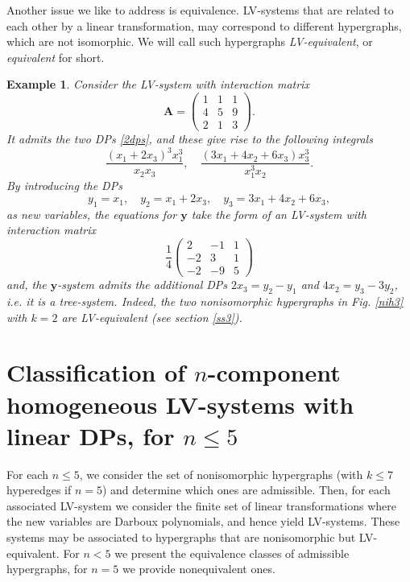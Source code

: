 \documentclass{article}
\newcounter{NN}
\newtheorem{example}[NN]{Example}
\def\A{\mathbf{A}}
\def\y{{\mathbf y}}
\begin{document}
Another issue we like to address is equivalence. LV-systems that are related to each other by a linear transformation, may correspond to different hypergraphs, which are not isomorphic. We will call such hypergraphs {\em LV-equivalent}, or {\em equivalent} for short.
\begin{example}
Consider the LV-system with interaction matrix
\[
\A=\begin{pmatrix}
1 & 1 & 1 
\\
 4 & 5 & 9 
\\
 2 & 1 & 3 
\end{pmatrix}.
\]
It admits the two DPs \eqref{2dps}, and these give rise to the following integrals
\[
\frac{\left(x_{1}+2 x_{3}\right)^3 x_{1}^{3}}{x_{2} x_{3}},\quad
\frac{\left(3 x_{1}+4 x_{2}+6 x_{3}\right) x_{3}^{3}}{x_{1}^{3} x_{2}}.
\]
By introducing the DPs
\[
y_{1} = x_{1},\quad
y_{2} = x_{1}+2 x_{3},\quad
y_{3} = 3 x_{1}+4 x_{2}+6 x_{3},
\]
as new variables, the equations for $\y$ take the form of an LV-system with interaction matrix
\[
\frac 14 \begin{pmatrix}
2 & -1 & 1 
\\
 -2 & 3 & 1 
\\
 -2 & -9 & 5 
\end{pmatrix}
\]
and, the $\y$-system admits the additional DPs $2x_3=y_2-y_1$ and $4x_2=y_3-3y_2$, i.e. it is a tree-system. Indeed, the two nonisomorphic hypergraphs in Fig. \ref{nih3} with $k=2$ are LV-equivalent (see section \ref{ss3}).
\end{example}

\section{Classification of $n$-component homogeneous LV-systems with linear DPs, for $n\leq5$} \label{s4}
For each $n\leq 5$, we consider the set of nonisomorphic hypergraphs (with $k\leq 7$ hyperedges if $n=5$) and determine which ones are admissible. Then, for each associated LV-system we consider the finite set of linear transformations where the new variables are Darboux polynomials, and hence yield LV-systems.
These systems may be associated to hypergraphs that are nonisomorphic but LV-equivalent. For $n<5$ we present the equivalence classes of admissible hypergraphs, for $n=5$ we provide nonequivalent ones.  
\end{document}
